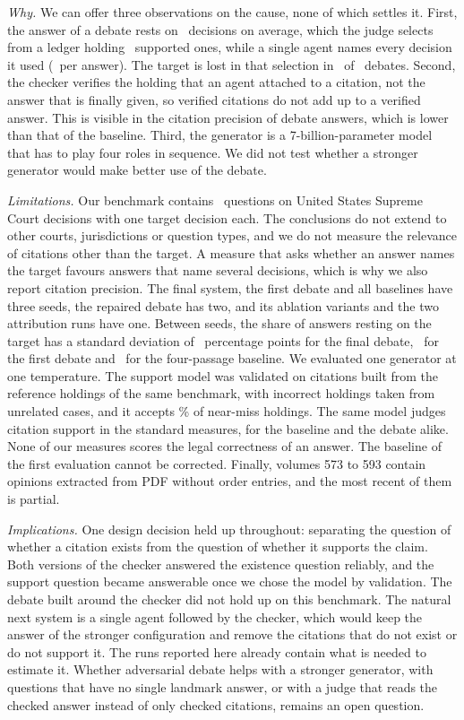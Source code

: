 \documentclass[conference]{IEEEtran}
\begin{document}
\emph{Why.} We can offer three observations on the cause, none of which settles it. First, the answer of a debate rests on \ResPaFinalCitesAnswer\ decisions on average, which the judge selects from a ledger holding \ResFinalLossSupportedPerDebate\ supported ones, while a single agent names every decision it used (\ResPaBaseFourRCitesAnswer\ per answer). The target is lost in that selection in \ResFinalLossLostSupported\ of \ResFinalLossCases\ debates. Second, the checker verifies the holding that an agent attached to a citation, not the answer that is finally given, so verified citations do not add up to a verified answer. This is visible in the citation precision of debate answers, which is lower than that of the baseline. Third, the generator is a 7-billion-parameter model that has to play four roles in sequence. We did not test whether a stronger generator would make better use of the debate.

\emph{Limitations.} Our benchmark contains \ResTestCases\ questions on United States Supreme Court decisions with one target decision each. The conclusions do not extend to other courts, jurisdictions or question types, and we do not measure the relevance of citations other than the target. A measure that asks whether an answer names the target favours answers that name several decisions, which is why we also report citation precision. The final system, the first debate and all baselines have three seeds, the repaired debate has two, and its ablation variants and the two attribution runs have one. Between seeds, the share of answers resting on the target has a standard deviation of \ResPaFinalTargetAnswerSD\ percentage points for the final debate, \ResPaOldTargetAnswerSD\ for the first debate and \ResPaBaseFourRTargetAnswerSD\ for the four-passage baseline. We evaluated one generator at one temperature. The support model was validated on citations built from the reference holdings of the same benchmark, with incorrect holdings taken from unrelated cases, and it accepts \ResProbeNearMissPct\% of near-miss holdings. The same model judges citation support in the standard measures, for the baseline and the debate alike. None of our measures scores the legal correctness of an answer. The baseline of the first evaluation cannot be corrected. Finally, volumes 573 to 593 contain opinions extracted from PDF without order entries, and the most recent of them is partial.

\emph{Implications.} One design decision held up throughout: separating the question of whether a citation exists from the question of whether it supports the claim. Both versions of the checker answered the existence question reliably, and the support question became answerable once we chose the model by validation. The debate built around the checker did not hold up on this benchmark. The natural next system is a single agent followed by the checker, which would keep the answer of the stronger configuration and remove the citations that do not exist or do not support it. The runs reported here already contain what is needed to estimate it. Whether adversarial debate helps with a stronger generator, with questions that have no single landmark answer, or with a judge that reads the checked answer instead of only checked citations, remains an open question.
\end{document}
